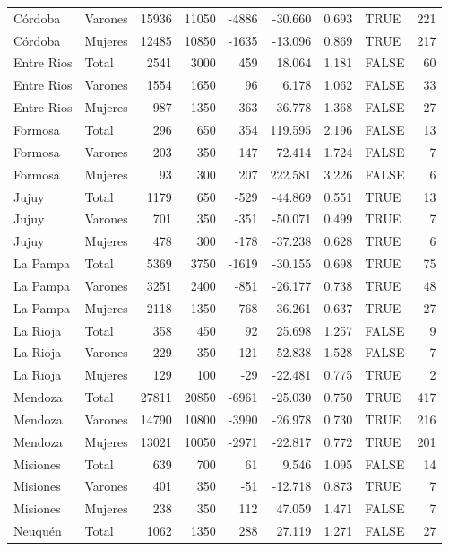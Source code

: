 \begin{table}
\begin{tabular}[t]{llrrrrrlr}
Córdoba & Varones & 15936 & 11050 & -4886 & -30.660 & 0.693 & TRUE & 221\\
\addlinespace
Córdoba & Mujeres & 12485 & 10850 & -1635 & -13.096 & 0.869 & TRUE & 217\\
Entre Rios & Total & 2541 & 3000 & 459 & 18.064 & 1.181 & FALSE & 60\\
Entre Rios & Varones & 1554 & 1650 & 96 & 6.178 & 1.062 & FALSE & 33\\
Entre Rios & Mujeres & 987 & 1350 & 363 & 36.778 & 1.368 & FALSE & 27\\
Formosa & Total & 296 & 650 & 354 & 119.595 & 2.196 & FALSE & 13\\
\addlinespace
Formosa & Varones & 203 & 350 & 147 & 72.414 & 1.724 & FALSE & 7\\
Formosa & Mujeres & 93 & 300 & 207 & 222.581 & 3.226 & FALSE & 6\\
Jujuy & Total & 1179 & 650 & -529 & -44.869 & 0.551 & TRUE & 13\\
Jujuy & Varones & 701 & 350 & -351 & -50.071 & 0.499 & TRUE & 7\\
Jujuy & Mujeres & 478 & 300 & -178 & -37.238 & 0.628 & TRUE & 6\\
\addlinespace
La Pampa & Total & 5369 & 3750 & -1619 & -30.155 & 0.698 & TRUE & 75\\
La Pampa & Varones & 3251 & 2400 & -851 & -26.177 & 0.738 & TRUE & 48\\
La Pampa & Mujeres & 2118 & 1350 & -768 & -36.261 & 0.637 & TRUE & 27\\
La Rioja & Total & 358 & 450 & 92 & 25.698 & 1.257 & FALSE & 9\\
La Rioja & Varones & 229 & 350 & 121 & 52.838 & 1.528 & FALSE & 7\\
\addlinespace
La Rioja & Mujeres & 129 & 100 & -29 & -22.481 & 0.775 & TRUE & 2\\
Mendoza & Total & 27811 & 20850 & -6961 & -25.030 & 0.750 & TRUE & 417\\
Mendoza & Varones & 14790 & 10800 & -3990 & -26.978 & 0.730 & TRUE & 216\\
Mendoza & Mujeres & 13021 & 10050 & -2971 & -22.817 & 0.772 & TRUE & 201\\
Misiones & Total & 639 & 700 & 61 & 9.546 & 1.095 & FALSE & 14\\
\addlinespace
Misiones & Varones & 401 & 350 & -51 & -12.718 & 0.873 & TRUE & 7\\
Misiones & Mujeres & 238 & 350 & 112 & 47.059 & 1.471 & FALSE & 7\\
Neuquén & Total & 1062 & 1350 & 288 & 27.119 & 1.271 & FALSE & 27\\

\end{tabular}
\end{table}
